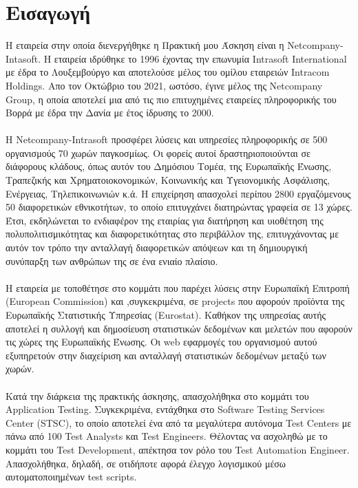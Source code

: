\chapter*{Εισαγωγή}

Η εταιρεία στην οποία διενεργήθηκε η Πρακτική μου Άσκηση είναι η Netcompany-Intasoft. Η εταιρεία ιδρύθηκε το 1996 έχοντας την επωνυμία Intrasoft International με έδρα το Λουξεμβούργο και αποτελούσε μέλος του ομίλου εταιρειών Intracom Holdings. Απο τον Οκτώβριο του 2021, ωστόσο, έγινε μέλος της Netcompany Group, η οποία αποτελεί μια από τις πιο επιτυχημένες εταιρείες πληροφορικής του Βορρά με έδρα την Δανία με έτος ίδρυσης το 2000.
\\ \\
Η Netcompany-Intrasoft προσφέρει λύσεις και υπηρεσίες πληροφορικής σε 500 οργανισμούς 70 χωρών παγκοσμίως. Οι φορείς αυτοί δραστηριοποιούνται σε διάφορους κλάδους, όπως αυτόν του Δημόσιου Τομέα, της Ευρωπαϊκής Ένωσης, Τραπεζικής και Χρηματοιοκονομικών, Κοινωνικής και Υγειονομικής Ασφάλισης, Ενέργειας, Τηλεπικοινωνιών κ.ά. Η επιχείρηση απασχολεί περίπου 2800 εργαζόμενους 50 διαφορετικών εθνικοτήτων, το οποίο επιτυγχάνει διατηρώντας γραφεία σε 13 χώρες. Έτσι, εκδηλώνεται το ενδιαφέρον της εταιρίας για διατήρηση και υιοθέτηση της πολυπολιτισμικότητας και διαφορετικότητας στο περιβάλλον της, επιτυγχάνοντας με αυτόν τον τρόπο την ανταλλαγή διαφορετικών απόψεων και τη δημιουργική συνύπαρξη των ανθρώπων της σε ένα ενιαίο πλαίσιο.
\\ \\
Η εταιρεία με τοποθέτησε στο κομμάτι που παρέχει λύσεις στην Ευρωπαϊκή Επιτροπή (European Commission) και ,συγκεκριμένα, σε projects που αφορούν προϊόντα της Ευρωπαϊκής Στατιστικής Υπηρεσίας (Eurostat). Καθήκον της υπηρεσίας αυτής αποτελεί η συλλογή και δημοσίευση στατιστικών δεδομένων και μελετών που αφορούν τις χώρες της Ευρωπαϊκής Ένωσης. Οι web εφαρμογές του οργανισμού αυτού εξυπηρετούν στην διαχείριση και ανταλλαγή στατιστικών δεδομένων μεταξύ των χωρών.
\\ \\
    Κατά την διάρκεια της πρακτικής άσκησης, απασχολήθηκα στο κομμάτι του Application Testing. Συγκεκριμένα, εντάχθηκα στο Software Testing Services Center (STSC), το οποίο αποτελεί ένα από τα μεγαλύτερα αυτόνομα Test Centers με πάνω από 100 Test Analysts και Test Engineers. Θέλοντας να ασχοληθώ με το κομμάτι του Test Development, απέκτησα τον ρόλο του Test Automation Engineer. Απασχολήθηκα, δηλαδή, σε οτιδήποτε αφορά έλεγχο λογισμικού μέσω αυτοματοποιημένων test scripts.